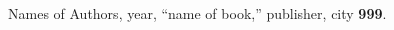 \documentclass[aps,twocolumn,pre,nofootinbib]{revtex4}
\begin{document}


\begin{thebibliography}{5}

\bibitem[Reflabel]  Names of Authors, year, ``name of book,'' publisher, city {\bf 999}.


\end{thebibliography}
\end{document}
